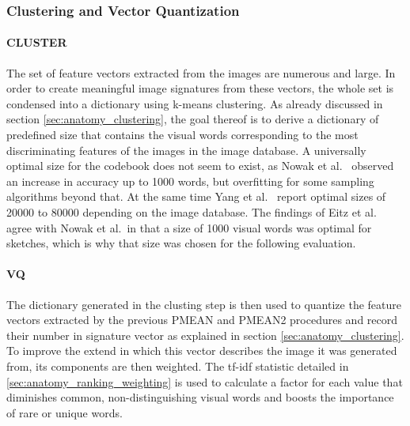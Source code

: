 \subsubsection{Clustering and Vector Quantization}

\paragraph{CLUSTER}

The set of feature vectors extracted from the images are numerous and large.
In order to create meaningful image signatures from these vectors, the whole
set is condensed into a dictionary using k-means clustering. As already
discussed in section \ref{sec:anatomy_clustering}, the goal thereof is to
derive a dictionary of predefined size that contains the visual words
corresponding to the most discriminating features of the images in the image
database. A universally optimal size for the codebook does not seem to exist,
as Nowak et al.\ \autocite{nowak_sampling_2006} observed an increase in accuracy
up to 1000 words, but overfitting for some sampling algorithms beyond that. At
the same time Yang et al.\ \autocite{yang_evaluating_2007} report optimal sizes
of 20000 to 80000 depending on the image database. The findings of Eitz et al.\
\autocite{eitz_sketch-based_2010} agree with Nowak et al.\ in that a size of
1000 visual words was optimal for sketches, which is why that size was chosen
for the following evaluation.

\paragraph{VQ}

The dictionary generated in the clusting step is then used to quantize the
feature vectors extracted by the previous PMEAN and PMEAN2 procedures and
record their number in signature vector as explained in section
\ref{sec:anatomy_clustering}. To improve the extend in which this vector
describes the image it was generated from, its components are then weighted.
The tf-idf statistic detailed in \ref{sec:anatomy_ranking_weighting} is used to
calculate a factor for each value that diminishes common, non-distinguishing
visual words and boosts the importance of rare or unique words.
